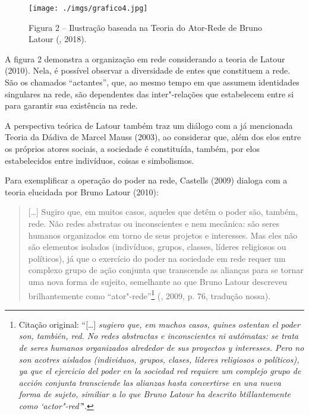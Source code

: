\begin{figure}[!ht]
\centering
  \texttt{[image: ./imgs/grafico4.jpg]}
\caption{Figura 2 -- Ilustração baseada na Teoria do Ator-Rede de Bruno Latour (, 2018).}
 \end{figure}

A figura 2 demonstra a organização em rede considerando a teoria de
Latour (2010). Nela, é possível observar a diversidade de entes que
constituem a rede. São os chamados ``actantes'', que, ao mesmo tempo em
que assumem identidades singulares na rede, são dependentes das
inter"-relações que estabelecem entre si para garantir sua existência na
rede.

A perspectiva teórica de Latour também traz um diálogo com a já
mencionada Teoria da Dádiva de Marcel Mauss (2003), ao considerar que,
além dos elos entre os próprios atores sociais, a sociedade é
constituída, também, por elos estabelecidos entre indivíduos, coisas e
simbolismos.

Para exemplificar a operação do poder na rede, Castells (2009) dialoga
com a teoria elucidada por Bruno Latour (2010):

\begin{quote}
[\ldots{}] Sugiro que, em muitos casos, aqueles que detêm o poder são,
também, rede. Não redes abstratas ou inconscientes e nem mecânica: são
seres humanos organizados em torno de seus projetos e interesses. Mas
eles não são elementos isolados (indivíduos, grupos, classes, líderes
religiosos ou políticos), já que o exercício do poder na sociedade em
rede requer um complexo grupo de ação conjunta que transcende as
alianças para se tornar uma nova forma de sujeito, semelhante ao que
Bruno Latour descreveu brilhantemente como ``ator"-rede''\footnote{Citação
  original: ``[\ldots{}] \emph{sugiero que, em muchos casos, quines ostentan el
        poder son, también, red. No redes abstractas e inconscientes ni
        autómatas: se trata de seres humanos organizados alrededor de sus
        proyectos y interesses. Pero no son acotres aislados (individuos,
        grupos, clases, líderes religiosos o políticos), ya que el ejercicio
        del poder en la sociedad red requiere um complejo grupo de acción
        conjunta transciende las alianzas hasta convertirse en una nueva forma
        de sujeto, similiar a lo que Bruno Latour ha descrito btillantemente
        como `actor"-red'}".} (, 2009, p. 76, tradução nossa).
\end{quote}


